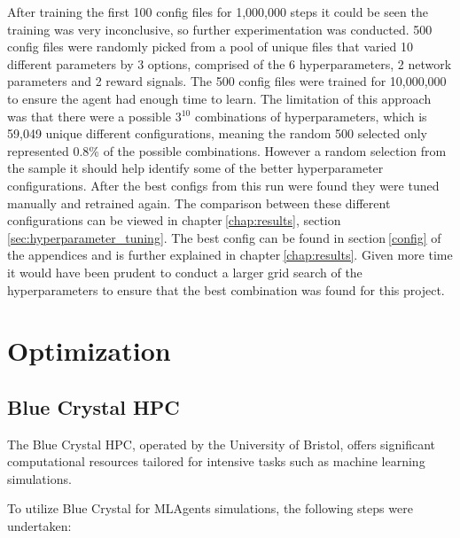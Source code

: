 After training the first 100 config files for 1,000,000 steps it could be seen the training was very inconclusive, so further experimentation was conducted. 500 config files were randomly picked from a pool of unique files that varied 10 different parameters by 3 options, comprised of the 6 hyperparameters, 2 network parameters and 2 reward signals. The 500 config files were trained for 10,000,000 to ensure the agent had enough time to learn. The limitation of this approach was that there were a possible 3$^{10}$ combinations of hyperparameters, which is 59,049 unique different configurations, meaning the random 500 selected only represented 0.8\% of the possible combinations. However a random selection from the sample it should help identify some of the better hyperparameter configurations. After the best configs from this run were found they were tuned manually and retrained again. 
The comparison between these different configurations can be viewed in chapter$~$\ref{chap:results}, section$~$\ref{sec:hyperparameter_tuning}. The best config can be found in section$~$\ref{config} of the appendices and is further explained in chapter$~$\ref{chap:results}. Given more time it would have been prudent to conduct a larger grid search of the hyperparameters to ensure that the best combination was found for this project.


\section{Optimization}


\subsection{Blue Crystal HPC}

The Blue Crystal HPC, operated by the University of Bristol, offers significant computational resources tailored for intensive tasks such as machine learning simulations. 

To utilize Blue Crystal for MLAgents simulations, the following steps were undertaken:

